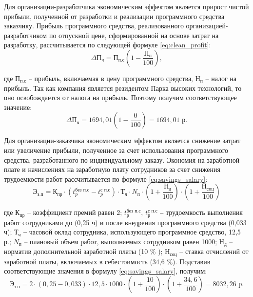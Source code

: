 Для организации-разработчика экономическим эффектом является прирост чистой прибыли, полученной от разработки и реализации программного средства заказчику.
Прибыль программного средства, реализованного организацией-разработчиком по отпускной цене, сформированной на основе затрат на разработку, рассчитывается по следующей формуле \ref{eq:clean_profit}:
\begin{equation}
	\label{eq:clean_profit}   
	\Delta 	\mathrm{П_{ч}} = \mathrm{П_{п.с}} \left( 1 - \frac{	\mathrm{Н_{п}}}{100} \right),
\end{equation}

где $\text{П}_{\text{п.с}}$ – прибыль, включаемая в цену программного средства, $\text{Н}_{\text{п}}$ – налог на прибыль. Так как компания является резидентом Парка высоких технологий, то оно освобождается от налога на прибыль. Поэтому получим соответствующее значение:
\[
\Delta \mathrm{П_{ч}} = 1694{,}01 \left(1 - \frac{0}{100}\right) = 1694{,}01 \text{ р}.
\]

Для организации-заказчика экономическим эффектом является снижение затрат или увеличение прибыли, полученное за счет использования программного средства, разработанного по индивидуальному заказу. Экономия на заработной плате и начислениях на заработную плату сотрудников за счет снижения трудоемкости работ рассчитывается по формуле \ref{eq:savings_salary}:
\begin{equation}
	\label{eq:savings_salary}
	\mathrm{Э_{з.п}} = \mathrm{К_{пр}} \cdot (t_p^{\text{без п.с}} - t_p^{\text{с п.с}}) \cdot \mathrm{Т_{ч}} \cdot N_{\text{п}} \cdot \left(1 + \frac{\mathrm{Н_{д}}}{100}\right) \cdot \left(1 + \frac{\mathrm{Н_{соц}}}{100}\right)
\end{equation}

где $\mathrm{К_{пр}}$ – коэффициент премий равен 2; $t_\text{р}^{\text{без п.с}}$, $t_\text{р}^{\text{с п.с}}$ ‒ трудоемкость выполнения работ сотрудниками до (0,25 ч) и после внедрения программного средства (0,033 ч); $\text{Т}_{\text{ч}}$ ‒ часовой оклад сотрудника, использующего программное средство, 12,5 р.; $N_{\text{п}}$ – плановый объем работ, выполняемых сотрудником равен 1000; $\mathrm{Н_{д}}$ – норматив дополнительной заработной платы (10 \% ); $\mathrm{Н_{соц}}$ – ставка отчислений от заработной платы, включаемых в себестоимость (34,6 \%). Подставив соответствующие значения в формулу \ref{eq:savings_salary}, получим:
\[
\mathrm{Э_{з.п}} = 2 \cdot (0{,}25 - 0{,}033 ) \cdot 12{,}5 \cdot 1000 \cdot \left(1 + \frac{10}{100}\right) \cdot \left(1 + \frac{34{,}6}{100}\right) = 8032{,}26  \text{ р}.
\]

